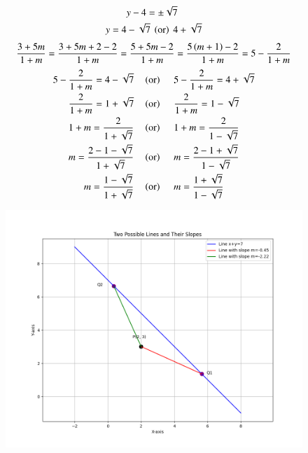 \documentclass[journal]{IEEEtran}
\begin{document}
\begin{align}
&y-4=\pm\sqrt7 \\
y=4&-\sqrt{7}\ \left(\text{or}\right)\  4+\sqrt{7}
\end{align}
\begin{align}
\frac{3+5m}{1+m} = \frac{3+5m+2-2}{1+m}= \frac{5+5m-2}{1+m}=\frac{5\left(m+1\right)-2}{1+m}=5-\frac{2}{1+m}
\end{align}
\begin{align}
5-\frac{2}{1+m}= 4-\sqrt{7}\quad &\brak{\text{or}}\ \quad  5-\frac{2}{1+m}=4+\sqrt{7} \\
\frac{2}{1+m} = 1+\sqrt{7}\quad &\brak{\text{or}}\ \quad \frac{2}{1+m} =1-\sqrt{7} \\
1+m = \frac{2}{1+\sqrt{7}}\quad &\brak{\text{or}}\ \quad 1+m = \frac{2}{1-\sqrt{7}}  \\
m=\frac{2-1-\sqrt{7}}{1+\sqrt{7}}\quad &\brak{\text{or}}\ \quad m = \frac{2-1+\sqrt{7}}{1-\sqrt{7}}  \\
m=\frac{1-\sqrt{7}}{1+\sqrt{7}} \quad &\brak{\text{or}}\ \quad m=\frac{1+\sqrt{7}}{1-\sqrt{7}}
\end{align}
\begin{figure}[h!]
   \centering
   \includegraphics[width=0.7\columnwidth]{figs/fig1.png}
   \caption{}
   \label{Figure}
\end{figure}
\end{document}
